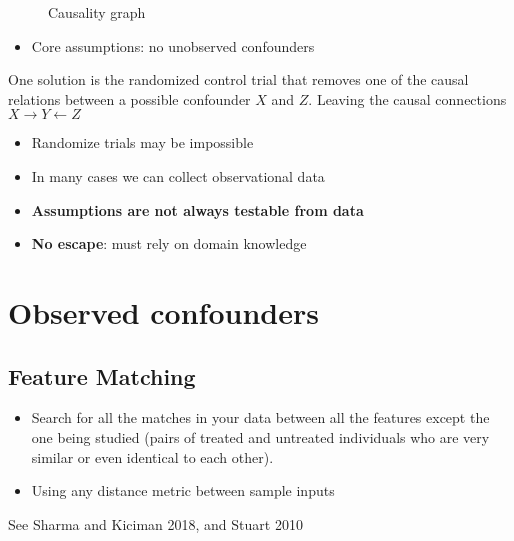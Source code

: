 \begin{figure}[h]
  \centering
  \caption{Causality graph}
\end{figure}

\begin{itemize}
  \item Core assumptions: no unobserved confounders
\end{itemize}

One solution is the randomized control trial that removes one of the causal
relations between a possible confounder $X$ and $Z$. Leaving the causal
connections $X \to Y \leftarrow Z$

\begin{itemize}
  \item Randomize trials may be impossible
  \item In many cases we can collect observational data
  \item \textbf{Assumptions are not always testable from data}
  \item \textbf{No escape}: must rely on domain knowledge
\end{itemize}

\section{Observed confounders}

\subsection{Feature Matching}

\begin{itemize}
  \item Search for all the matches in your data between all the features except
    the one being studied (pairs of treated and untreated individuals who are
    very similar or even identical to each other).
  \item Using any distance metric between sample inputs
\end{itemize}

See Sharma and Kiciman 2018, and Stuart 2010

